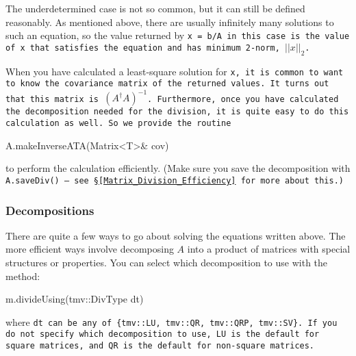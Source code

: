 The underdetermined case is not so common, but it can still be defined reasonably.  
As mentioned above, there are usually infinitely many solutions to such an equation, so the
value returned by \tt{x = b/A} in this case is the value of \tt{x} that satisfies the 
equation and has minimum 2-norm, $||x||_2$.

When you have calculated a least-square solution for \tt{x}, it is common to want 
to know the covariance matrix of the returned values.  It turns out that this
matrix is $(A^\dagger A)^{-1}$.  Furthermore, once you have calculated the decomposition
needed for the division, it is quite easy to do this calculation as well.  So we provide the routine 
\begin{tmvcode}
A.makeInverseATA(Matrix<T>& cov)
\end{tmvcode}
to perform the calculation efficiently.  (Make sure you save the decomposition with 
\tt{A.saveDiv()} -- see \S\ref{Matrix_Division_Efficiency} for more about this.)

\subsubsection{Decompositions}
\label{Matrix_Division_Decompositions}

There are quite a few ways to go about solving the equations written above.  
The more efficient ways involve decomposing $A$ into a product of
matrices with special structures or properties.  
You can select which decomposition to use with the method:
\begin{tmvcode}
m.divideUsing(tmv::DivType dt)
\end{tmvcode}
where \tt{dt} can be any of \tt{\{tmv::LU, tmv::QR, tmv::QRP, tmv::SV\}}.
If you do not specify which decomposition to use, \tt{LU} is the 
default for square matrices, and \tt{QR} is the default for
non-square matrices.

